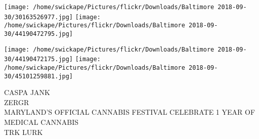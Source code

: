 \documentclass[10pt,letterpaper]{article}
\begin{document}
\texttt{[image: /home/swickape/Pictures/flickr/Downloads/Baltimore 2018-09-30/30163526977.jpg]}
\texttt{[image: /home/swickape/Pictures/flickr/Downloads/Baltimore 2018-09-30/44190472795.jpg]}

\texttt{[image: /home/swickape/Pictures/flickr/Downloads/Baltimore 2018-09-30/44190472175.jpg]}
\texttt{[image: /home/swickape/Pictures/flickr/Downloads/Baltimore 2018-09-30/45101259881.jpg]}

CASPA JANK\\
ZERGR\\
MARYLAND'S OFFICIAL CANNABIS FESTIVAL CELEBRATE 1 YEAR OF MEDICAL CANNABIS\\
TRK LURK
\pagebreak
\end{document}
